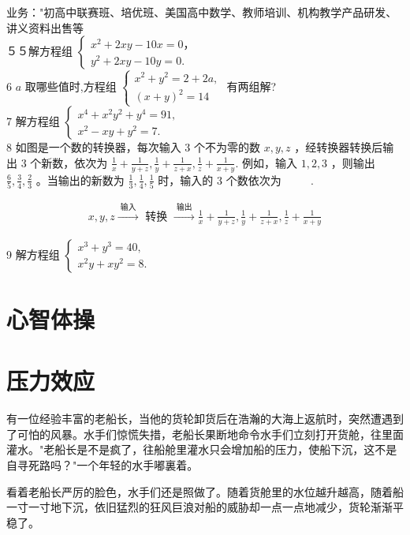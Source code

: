 \documentclass[10pt]{article}
\begin{document}
业务："初高中联赛班、培优班、美国高中数学、教师培训、机构教学产品研发、讲义资料出售等\\
５５解方程组 $\left\{\begin{array}{l}x^{2}+2 x y-10 x=0 ， \\ y^{2}+2 x y-10 y=0 .\end{array}\right.$\\
6 $a$ 取哪些值时,方程组 $\left\{\begin{array}{l}x^{2}+y^{2}=2+2 a, \\ (x+y)^{2}=14\end{array}\right.$ 有两组解?\\
7 解方程组 $\left\{\begin{array}{l}x^{4}+x^{2} y^{2}+y^{4}=91, \\ x^{2}-x y+y^{2}=7 .\end{array}\right.$\\
8 如图是一个数的转换器，每次输入 3 个不为零的数 $x, y, z$ ，经转换器转换后输出 3 个新数，依次为 $\frac{1}{x}+\frac{1}{y+z}, \frac{1}{y}+\frac{1}{z+x}, \frac{1}{z}+\frac{1}{x+y}$. 例如，输入 $1,2,3$ ，则输出 $\frac{6}{5}, \frac{3}{4}, \frac{2}{3}$ 。当输出的新数为 $\frac{1}{3}, \frac{1}{4}, \frac{1}{5}$ 时，输入的 3 个数依次为 $\qquad$ .

\begin{align*}
x, y, z \xrightarrow{\text { 输入 }} \text { 转换 } \xrightarrow{\text { 输出 }} \frac{1}{x}+\frac{1}{y+z}, \frac{1}{y}+\frac{1}{z+x}, \frac{1}{z}+\frac{1}{x+y}
\end{align*}

9 解方程组 $\left\{\begin{array}{l}x^{3}+y^{3}=40, \\ x^{2} y+x y^{2}=8 .\end{array}\right.$

\section*{心智体操}
\section*{压力效应}
有一位经验丰富的老船长，当他的货轮卸货后在浩瀚的大海上返航时，突然遭遇到了可怕的风暴。水手们惊慌失措，老船长果断地命令水手们立刻打开货舱，往里面灌水。"老船长是不是疯了，往船舱里灌水只会增加船的压力，使船下沉，这不是自寻死路吗？"一个年轻的水手嘟裏着。

看着老船长严厉的脸色，水手们还是照做了。随着货舱里的水位越升越高，随着船一寸一寸地下沉，依旧猛烈的狂风巨浪对船的威胁却一点一点地减少，货轮渐渐平稳了。
\end{document}
